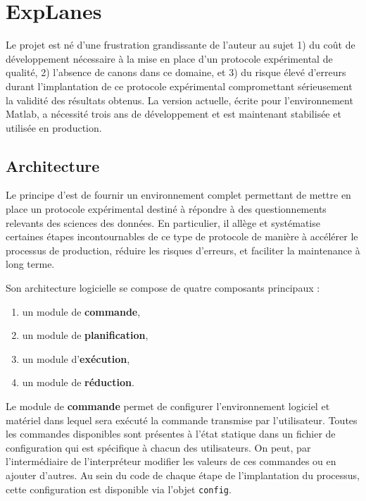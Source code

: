\section{\nmu ExpLanes} \label{sec:explanes}

Le projet \explanes {} est né d'une frustration grandissante de l'auteur au sujet 1) du coût de développement nécessaire à la mise en place d'un protocole expérimental de qualité, 2) l'absence de canons dans ce domaine, et 3) du risque élevé d'erreurs durant l'implantation de ce protocole expérimental compromettant sérieusement la validité des résultats obtenus. La version actuelle, écrite pour l'environnement \textsf{Matlab}\textsuperscript{\tiny\textregistered}, a nécessité trois ans de développement et est maintenant stabilisée et utilisée en production.

\subsection{Architecture}


Le principe d'\explanes est de fournir un environnement complet permettant de mettre en place un protocole expérimental destiné à répondre à des questionnements relevants des sciences des données. En particulier, il allège et systématise certaines étapes incontournables de ce type de protocole de manière à accélérer le processus de production, réduire les risques d'erreurs, et faciliter la maintenance à long terme.

Son architecture logicielle se compose de quatre composants principaux :
\begin{enumerate}
  \item un module de \textbf{commande},
  \item un module de \textbf{planification},
  \item un module d'\textbf{exécution},
  \item un module de \textbf{réduction}.
\end{enumerate}

Le module de \textbf{commande} permet de configurer l'environnement logiciel et matériel dans lequel sera exécuté la commande transmise par l'utilisateur. Toutes les commandes disponibles sont présentes à l'état statique dans un fichier de configuration qui est spécifique à chacun des utilisateurs. On peut, par l'intermédiaire de l'interpréteur modifier les valeurs de ces commandes ou en ajouter d'autres. Au sein du code de chaque étape de l'implantation du processus, cette configuration est disponible via l'objet \texttt{config}.

